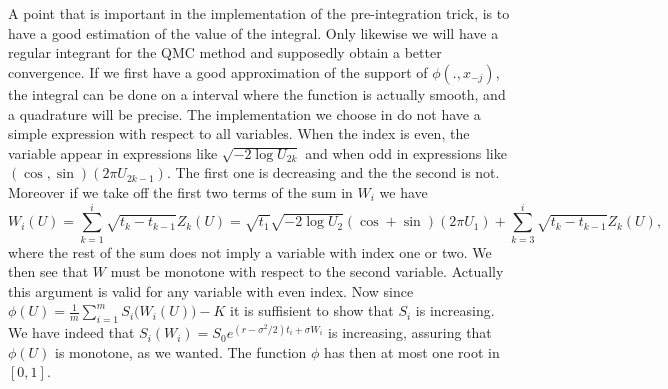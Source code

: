 \documentclass[a4paper]{article}
\theoremstyle{definition}
\theoremstyle{remark}
\newcommand{\s}{\sigma}
\begin{document}
\part{}
A point that is important in the implementation of the pre-integration trick, is to have a good estimation of the value of the integral. Only likewise we will have a regular integrant for the QMC method and supposedly obtain a better convergence. If we first have a good approximation of the support of $\phi(.,x_{-j})$, the integral can be done on a interval where the function is actually smooth, and a quadrature will be precise. The implementation we choose in  do not have a simple expression with respect to all variables. When the index is even, the variable appear in expressions like $\sqrt{-2\log{U_{2k}}}$ and when odd in expressions like $(\cos,\sin)(2\pi U_{2k-1})$. The first one is decreasing and the the second is not. Moreover if we take off the first two terms of the sum in $W_i$ we have 
$$W_i(U)
= \sum_{k=1}^i \sqrt{t_k-t_{k-1}}Z_k(U)
= \sqrt{t_1} \sqrt{-2\log{U_{2}}}(\cos+\sin)(2\pi U_{1})
+ \sum_{k=3}^i \sqrt{t_k-t_{k-1}}Z_k(U),$$
where the rest of the sum does not imply a variable with index one or two. We then see that $W$ must be monotone with respect to the second variable. Actually this argument is valid for any variable with even index. Now since $\phi(U)= \frac{1}{m}\sum_{i=1} ^m S_i\big(W_i(U)\big) - K$ it is suffisient to show that $S_i$ is increasing. We have indeed that $S_i(W_i) = S_0 e^{(r-\s^2/2)t_i + \s W_i}$ is increasing, assuring that $\phi(U)$ is monotone, as we wanted.
The function $\phi$ has then at most one root in $[0,1]$.
\end{document}

